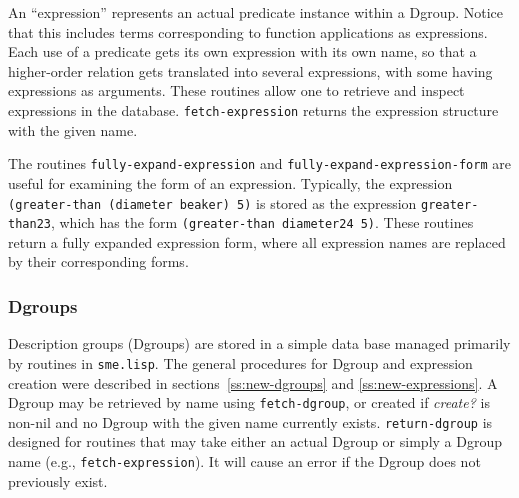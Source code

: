 
An ``expression'' represents an actual predicate instance within a Dgroup.  Notice
that this includes terms corresponding to function applications as expressions.
Each use of a predicate gets its own expression with its own name, so that a
higher-order relation gets translated into several expressions, with some having
expressions as arguments. These routines allow one to retrieve and inspect expressions
in the database. {\tt fetch-expression} returns the expression structure with the given
name.

The routines {\tt fully-expand-expression} and {\tt fully-expand-expression-form} are
useful for examining the form of an expression. Typically, the expression {\tt
(greater-than (diameter beaker) 5)} is stored as the expression {\tt greater-than23},
which has the form {\tt (greater-than diameter24 5)}. These routines return
a fully expanded expression form, where all expression names are replaced by their
corresponding forms.


\subsubsection{Dgroups}

\indent
{}

Description groups (Dgroups) are stored in a simple data base managed
primarily by routines in {\tt sme.lisp}. The general procedures for Dgroup
and expression creation were described in sections~\ref{ss:new-dgroups} and
\ref{ss:new-expressions}. A Dgroup may be retrieved by name using
{\tt fetch-dgroup}, or created if {\it create?} is non-nil and no Dgroup
with the given name currently exists. {\tt return-dgroup} is designed for
routines that may take either an actual Dgroup or simply a Dgroup name
(e.g., {\tt fetch-expression}). It will cause an error if the Dgroup does not
previously exist.


